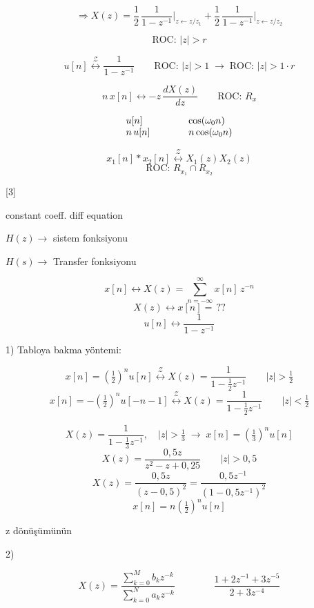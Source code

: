\documentclass[11pt,a4paper]{article}
\begin{document}
\[ \Rightarrow X(z) = \frac12\,\frac{1}{1-z^{-1}}\Big|_{z\leftarrow z/z_1} + \frac12\,\frac{1}{1-z^{-1}}\Big|_{z\leftarrow z/z_2} \]

\[ \text{ROC: } |z|>r \]

\okunamadi{}

\[ u[n] \overset{\mathcal{Z}}{\longleftrightarrow} \frac{1}{1-z^{-1}} \qquad \text{ROC: } |z|>1 \;\to\; \text{ROC: } |z|>1\cdot r \]

\[ n\,x[n] \longleftrightarrow -z\,\frac{dX(z)}{dz} \qquad \text{ROC: } R_x \]

\[ \begin{array}{l@{\qquad\qquad}l} u[n] & \cos(\omega_0 n) \\ n\,u[n] & n\cos(\omega_0 n) \end{array} \]

\[ x_1[n]\ast x_2[n] \overset{\mathcal{Z}}{\longleftrightarrow} X_1(z)X_2(z) \]
\[ \text{ROC: } R_{x_1}\cap R_{x_2} \]

[3]

constant coeff. diff equation

$H(z) \to$ sistem fonksiyonu

$H(s) \to$ Transfer fonksiyonu

\[ x[n] \longleftrightarrow X(z) = \sum_{n=-\infty}^{\infty} x[n]\,z^{-n} \]
\[ X(z) \longleftrightarrow x[n] = \,?? \]
\[ u[n] \longleftrightarrow \frac{1}{1-z^{-1}} \]

1) Tabloya bakma yöntemi:

\[ x[n] = \left(\tfrac12\right)^{n}u[n] \overset{\mathcal{Z}}{\longleftrightarrow} X(z) = \frac{1}{1-\frac12 z^{-1}} \qquad |z|>\tfrac12 \]
\[ x[n] = -\left(\tfrac12\right)^{n}u[-n-1] \overset{\mathcal{Z}}{\longleftrightarrow} X(z) = \frac{1}{1-\frac12 z^{-1}} \qquad |z|<\tfrac12 \]

\[ X(z) = \frac{1}{1-\frac13 z^{-1}}, \quad |z|>\tfrac13 \;\to\; x[n] = \left(\tfrac13\right)^{n}u[n] \]
\[ X(z) = \frac{0{,}5z}{z^2-z+0{,}25} \qquad |z|>0{,}5 \]
\[ X(z) = \frac{0{,}5z}{(z-0{,}5)^2} = \frac{0{,}5z^{-1}}{(1-0{,}5z^{-1})^2} \]
\[ x[n] = n\left(\tfrac12\right)^{n}u[n] \]

\begin{dikkat}
z dönüşümünün 
\end{dikkat}

2)

\[ X(z) = \frac{\sum_{k=0}^{M} b_k z^{-k}}{\sum_{k=0}^{N} a_k z^{-k}} \qquad\qquad \frac{1+2z^{-1}+3z^{-5}}{2+3z^{-4}} \]
\end{document}
